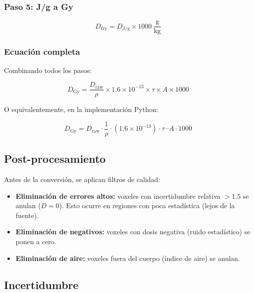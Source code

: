 \documentclass[12pt,a4paper]{article}
\begin{document}
\subsubsection{Paso 5: J/g a Gy}

\begin{equation}
    D_{\text{Gy}} = D_{\text{J/g}} \times 1000\ \frac{\text{g}}{\text{kg}}
\end{equation}

\subsubsection{Ecuación completa}

Combinando todos los pasos:

\begin{equation}
    \boxed{D_{\text{Gy}} = \frac{D_{\text{raw}}}{\rho} \times 1.6\times10^{-13} \times \tau \times A \times 1000}
\end{equation}

O equivalentemente, en la implementación Python:

\begin{equation}
    D_{\text{Gy}} = D_{\text{raw}} \cdot \frac{1}{\rho} \cdot (1.6 \times 10^{-13}) \cdot \tau \cdot A \cdot 1000
\end{equation}

\subsection{Post-procesamiento}

Antes de la conversión, se aplican filtros de calidad:

\begin{itemize}
    \item \textbf{Eliminación de errores altos:} voxeles con incertidumbre
        relativa $> 1.5$ se anulan ($D=0$). Esto ocurre en regiones con
        poca estadística (lejos de la fuente).
    \item \textbf{Eliminación de negativos:} voxeles con dosis negativa
        (ruido estadístico) se ponen a cero.
    \item \textbf{Eliminación de aire:} voxeles fuera del cuerpo (índice de
        aire) se anulan.
\end{itemize}

\subsection{Incertidumbre}
\end{document}
